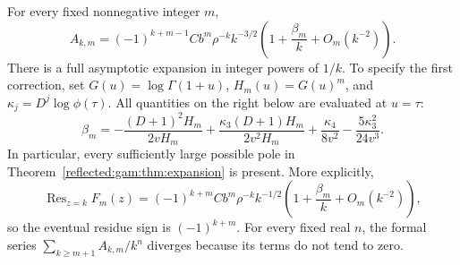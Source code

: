 \begin{theorem}\label{reflected:gam:thm:late}
For every fixed nonnegative integer $m$,
\begin{equation}\label{reflected:gam:eq:late}
 A_{k,m}=(-1)^{k+m-1}C b^m\rho^{-k}k^{-3/2}
 \left(1+\frac{\beta_m}{k}+O_m(k^{-2})\right).
\end{equation}
There is a full asymptotic expansion in integer powers of $1/k$.
To specify the first correction, set
$G(u)=\log\Gamma(1+u)$, $H_m(u)=G(u)^m$, and
$\kappa_j=D^j\log\phi(\tau)$.  All quantities on the right below
are evaluated at $u=\tau$:
\begin{equation}\label{reflected:gam:eq:beta}
 \beta_m=
 -\frac{(D+1)^2H_m}{2vH_m}
 +\frac{\kappa_3(D+1)H_m}{2v^2H_m}
 +\frac{\kappa_4}{8v^2}
 -\frac{5\kappa_3^2}{24v^3}.
\end{equation}
In particular, every sufficiently large possible pole in
Theorem~\ref{reflected:gam:thm:expansion} is present.  More explicitly,
\[
 \operatorname{Res}_{z=k}F_m(z)
 =(-1)^{k+m}C b^m\rho^{-k}k^{-1/2}
   \left(1+\frac{\beta_m}{k}+O_m(k^{-2})\right),
\]
so the eventual residue sign is $(-1)^{k+m}$.  For every fixed real $n$, the formal series
$\sum_{k\ge m+1}A_{k,m}/k^n$ diverges because its terms do not tend to zero.
\end{theorem}

